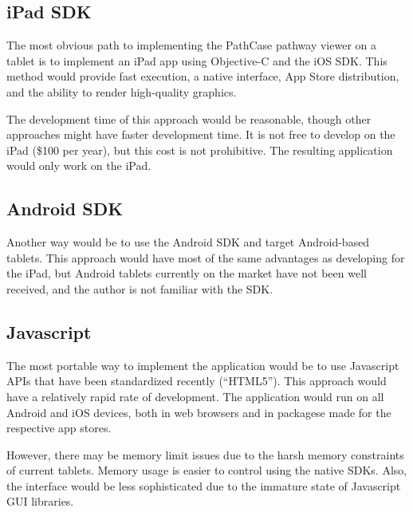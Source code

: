 \subsection{iPad SDK}

The most obvious path to implementing the PathCase pathway viewer on a tablet is to implement an iPad app using Objective-C and the iOS SDK. This method would provide fast execution, a native interface, App Store distribution, and the ability to render high-quality graphics.

The development time of this approach would be reasonable, though other approaches might have faster development time. It is not free to develop on the iPad (\$100 per year), but this cost is not prohibitive. The resulting application would only work on the iPad.

\subsection{Android SDK}

Another way would be to use the Android SDK and target Android-based tablets. This approach would have most of the same advantages as developing for the iPad, but Android tablets currently on the market have not been well received, and the author is not familiar with the SDK.

\subsection{Javascript}

The most portable way to implement the application would be to use Javascript APIs that have been standardized recently (``HTML5''). This approach would have a relatively rapid rate of development. The application would run on all Android and iOS devices, both in web browsers and in packagese made for the respective app stores.

However, there may be memory limit issues due to the harsh memory constraints of current tablets. Memory usage is easier to control using the native SDKs. Also, the interface would be less sophisticated due to the immature state of Javascript GUI libraries.
